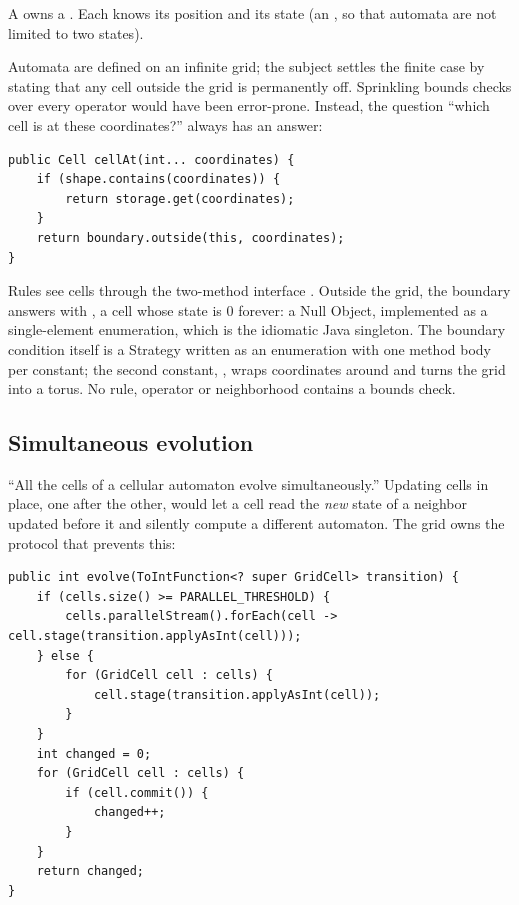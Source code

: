A  owns a . Each  knows its position and
its state (an , so that automata are not limited to two states).

Automata are defined on an infinite grid; the subject settles the finite case by stating that any
cell outside the grid is permanently off. Sprinkling bounds checks over every operator would have
been error-prone. Instead, the question ``which cell is at these coordinates?'' always has an
answer:

\begin{lstlisting}
public Cell cellAt(int... coordinates) {
    if (shape.contains(coordinates)) {
        return storage.get(coordinates);
    }
    return boundary.outside(this, coordinates);
}
\end{lstlisting}

Rules see cells through the two-method interface . Outside the grid, the
 boundary answers with , a cell whose state is 0 forever: a
Null Object, implemented as a single-element enumeration, which is the idiomatic Java singleton.
The boundary condition itself is a Strategy written as an enumeration with one method body per
constant; the second constant, , wraps coordinates around and turns the grid into
a torus. No rule, operator or neighborhood contains a bounds check.

\subsection{Simultaneous evolution}

``All the cells of a cellular automaton evolve simultaneously.'' Updating cells in place, one
after the other, would let a cell read the \emph{new} state of a neighbor updated before it and
silently compute a different automaton. The grid owns the protocol that prevents this:

\begin{lstlisting}
public int evolve(ToIntFunction<? super GridCell> transition) {
    if (cells.size() >= PARALLEL_THRESHOLD) {
        cells.parallelStream().forEach(cell -> cell.stage(transition.applyAsInt(cell)));
    } else {
        for (GridCell cell : cells) {
            cell.stage(transition.applyAsInt(cell));
        }
    }
    int changed = 0;
    for (GridCell cell : cells) {
        if (cell.commit()) {
            changed++;
        }
    }
    return changed;
}
\end{lstlisting}

